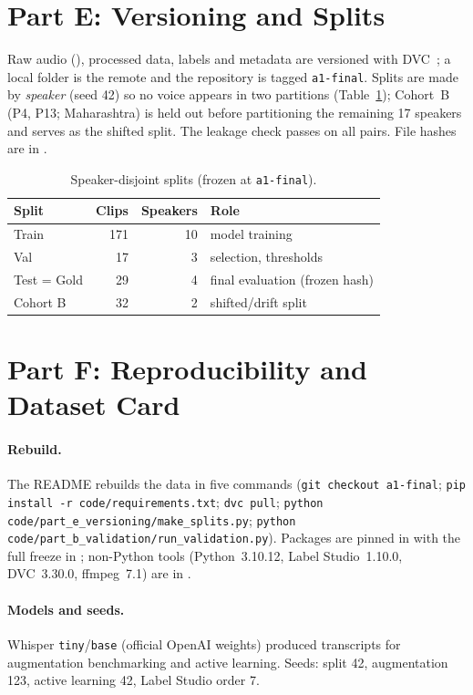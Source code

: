 \documentclass[sigconf,authordraft]{acmart}
\begin{document}
\section{Part E: Versioning and Splits}\label{sec:split}
Raw audio (), processed data, labels and metadata are versioned with DVC~\cite{DVC}; a local folder is the remote and the repository is tagged \texttt{a1-final}.
Splits are made by \emph{speaker} (seed 42) so no voice appears in two partitions (Table~\ref{tab:split}); Cohort~B (P4, P13; Maharashtra) is held out before partitioning the remaining 17 speakers and serves as the shifted split. The leakage check passes on all pairs. File hashes are in .
\begin{table}[htbp]
\caption{Speaker-disjoint splits (frozen at \texttt{a1-final}).}\label{tab:split}
\begin{tabular}{lrrl}
\toprule Split & Clips & Speakers & Role \\ \midrule
Train & 171 & 10 & model training \\ Val & 17 & 3 & selection, thresholds \\
Test = Gold & 29 & 4 & final evaluation (frozen hash) \\ Cohort B & 32 & 2 & shifted/drift split \\ \bottomrule
\end{tabular}
\end{table}

\section{Part F: Reproducibility and Dataset Card}\label{sec:repro}
\paragraph{Rebuild.} The README rebuilds the data in five commands (\texttt{git checkout a1-final}; \texttt{pip install -r code/requirements.txt}; \texttt{dvc pull}; \texttt{python code/part\_e\_versioning/make\_splits.py}; \texttt{python code/part\_b\_validation/run\_validation.py}). Packages are pinned in  with the full freeze in ; non-Python tools (Python~3.10.12, Label Studio~1.10.0, DVC~3.30.0, ffmpeg~7.1) are in .
\paragraph{Models and seeds.} Whisper \texttt{tiny}/\texttt{base} (official OpenAI weights) produced transcripts for augmentation benchmarking and active learning. Seeds: split 42, augmentation 123, active learning 42, Label Studio order 7.
\end{document}
